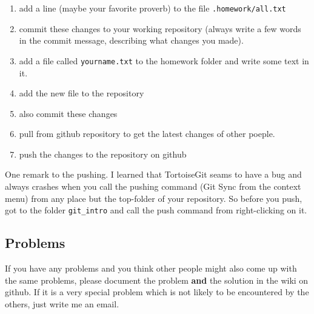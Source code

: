 \documentclass[]{article}
\begin{document}
\begin{enumerate}
    \item add a line (maybe your favorite proverb) to the file \texttt{.homework/all.txt}
    \item commit these changes to your working repository (always write a few words in the commit message, describing what changes you made).
    \item add a file called \texttt{yourname.txt} to the homework folder and write some text in it. 
    \item add the new file to the repository
    \item also commit these changes
    \item pull from github repository to get the latest changes of other poeple.
    \item push the changes to the repository on github
\end{enumerate}

One remark to the pushing. I learned that TortoiseGit seams to have a bug and always crashes when you call the pushing command (Git Sync from the context menu) from any place but the top-folder of your repository. So before you push, got to the folder \texttt{git\_intro} and call the push command from right-clicking on it. 



\subsection{Problems} %
\label{sg:sub:problems}

    If you have any problems and you think other people might also come up with the same problems, please document the problem \textbf{and} the solution in the wiki on github. If it is a very special problem which is not likely to be encountered by the others, just write me an email.



\end{document}
